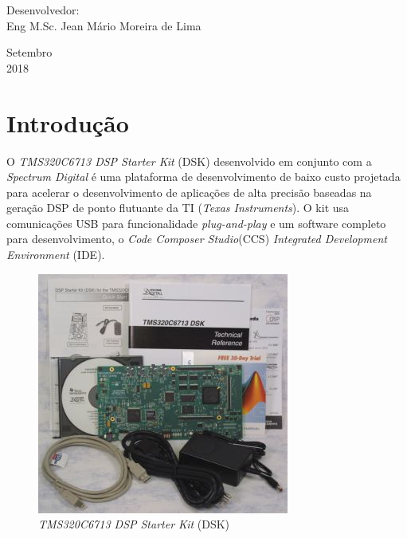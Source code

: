 \documentclass[a4paper, 12pt]{article}
\begin{document}
\begin{titlepage}
	\vfill
	
	\begin{flushleft}
		\begin{tabbing}
			Desenvolvedor: \\
			Eng\textordmasculine{ } M.Sc. Jean Mário Moreira de Lima\\
	\end{tabbing}
 \end{flushleft}
	\vspace{1cm}
	
	\begin{center}
		\vspace{\fill}
			 Setembro\\
		 2018
			\end{center}
\end{titlepage}


\newpage
\tableofcontents
\thispagestyle{empty}

\newpage
{}
\section{Introdução}

O \textit{TMS320C6713 DSP Starter Kit} (DSK) desenvolvido em conjunto com a \textit{Spectrum Digital} é uma plataforma de desenvolvimento de baixo custo projetada para acelerar o desenvolvimento de aplicações de alta precisão baseadas na geração DSP de ponto flutuante da TI (\textit{Texas Instruments}). O kit usa comunicações USB para funcionalidade \textit{plug-and-play} e um software completo para desenvolvimento, o \textit{Code Composer Studio}\texttrademark(CCS) \textit{Integrated Development Environment} (IDE).

\begin{figure}[htbp!] 
	\begin{center}
		\includegraphics[scale=2]{dsp_starter_kit.jpg}
		\caption{\textit{TMS320C6713 DSP Starter Kit} (DSK)}
		\label{Fig:dskdsp}
	\end{center} 
\end{figure}
\end{document}
